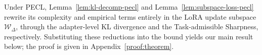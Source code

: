 \documentclass{article}
\theoremstyle{plain}
\theoremstyle{definition}
\theoremstyle{remark}
\begin{document}




Under PECL, Lemma~\ref{lem:kl-decomp-pecl} and Lemma~\ref{lem:subspace-loss-pecl} rewrite its complexity and empirical terms entirely in the LoRA update subspace $\mathcal W_\Delta$, through the adapter-level KL divergence and the Task-admissible Sharpness, respectively. 
Substituting these reductions into the bound yields our main result below; the proof is given in Appendix~\ref{proof:theorem}.


\end{document}
